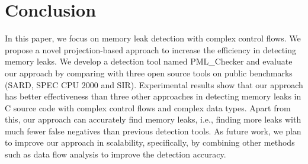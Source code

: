 \section{Conclusion}\label{sec:conclusion}

In this paper, we focus on memory leak detection with complex control flows. We propose a novel projection-based approach to increase the efficiency in detecting memory leaks. We develop a detection tool named PML\_Checker and evaluate our approach by comparing with three open source tools on public benchmarks (SARD, SPEC CPU $2000$ and SIR). Experimental results show that our approach has better effectiveness than three other approaches in detecting memory leaks in C source code with complex control flows and complex data types. Apart from this, our approach can accurately find memory leaks, i.e., finding more leaks with much fewer false negatives than previous detection tools. As future work, we plan to improve our approach in scalability, specifically, by combining other methods such as data flow analysis to improve the detection accuracy.
